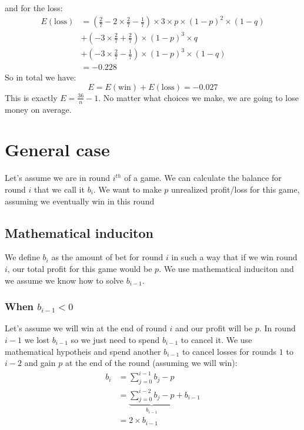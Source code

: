 \documentclass{book}
\begin{document}
	and for the loss:
	\begin{equation*}
		\begin{split}
			E(\text{loss}) &= (\frac{2}{7} - 2 \times \frac{2}{7} - \frac{1}{7}) \times 3 \times p \times (1 - p)^2 \times (1 - q) \\
			&+ (-3 \times \frac{2}{7} + \frac{2}{7}) \times (1 - p)^3 \times q \\
			&+ (-3 \times \frac{2}{7} - \frac{1}{7}) \times (1 - p)^3 \times (1 - q) \\
			&= -0.228
		\end{split}
	\end{equation*}
	So in total we have:
	\begin{equation*}
		E = E(\text{win}) + E(\text{loss}) = -0.027
	\end{equation*}
	This is exactly $E = \frac{36}{n} - 1$. No matter what choices we make, we are going to lose money on average.
	\section{General case}
	Let's assume we are in round $i^{th}$ of a game. We can calculate the balance for round $i$ that we call it $b_i$. We want to make $p$ unrealized profit/loss for this game, assuming we eventually win in this round
	\subsection{Mathematical induciton}
	We define $b_i$ as the amount of bet for round $i$ in such a way that if we win round $i$, our total profit for this game would be $p$. We use mathematical induciton and we assume we know how to solve $b_{i - 1}$.
	\subsubsection{When $b_{i - 1} < 0$}
	Let's assume we will win at the end of round $i$ and our profit will be $p$. In round $i - 1$ we lost $b_{i - 1}$ so we just need to spend $b_{i - 1}$ to cancel it. We use mathematical hypotheis and spend another $b_{i - 1}$ to cancel losses for rounds $1$ to $i - 2$ and gain $p$ at the end of the round (assuming we will win): 
	\begin{equation*}
		\begin{split}
			b_i &= \sum_{j = 0}^{i - 1}{b_j} - p \\
			&= \underbrace{\sum_{j = 0}^{i - 2}{b_j} - p}_{b_{i - 1}} + b_{i - 1} \\
			&= 2 \times b_{i - 1}
		\end{split}
	\end{equation*}
\end{document}
